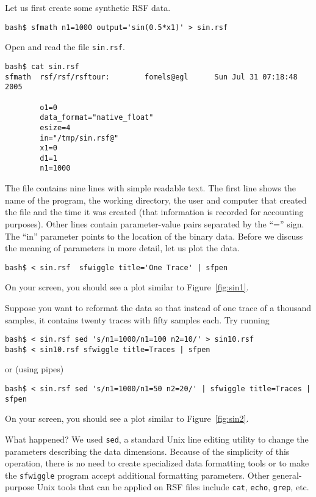 Let us first create some synthetic RSF data.
\begin{verbatim}
bash$ sfmath n1=1000 output='sin(0.5*x1)' > sin.rsf
\end{verbatim}

Open and read the file \texttt{sin.rsf}.
\begin{verbatim}
bash$ cat sin.rsf
sfmath  rsf/rsf/rsftour:        fomels@egl      Sun Jul 31 07:18:48 2005

        o1=0
        data_format="native_float"
        esize=4
        in="/tmp/sin.rsf@"
        x1=0
        d1=1
        n1=1000
\end{verbatim}
The file contains nine lines with simple readable text. The first line
shows the name of the program, the working directory, the user and
computer that created the file and the time it was created (that
information is recorded for accounting purposes). Other lines contain
parameter-value pairs separated by the ``='' sign. The ``in''
parameter points to the location of the binary data. Before we discuss
the meaning of parameters in more detail, let us plot the data.
\begin{verbatim}
bash$ < sin.rsf  sfwiggle title='One Trace' | sfpen
\end{verbatim}
On your screen, you should see a plot similar to Figure~\ref{fig:sin1}.

 
Suppose you want to reformat the data so that instead of one trace of a
thousand samples, it contains twenty traces with fifty samples each. Try
running
\begin{verbatim}
bash$ < sin.rsf sed 's/n1=1000/n1=100 n2=10/' > sin10.rsf 
bash$ < sin10.rsf sfwiggle title=Traces | sfpen
\end{verbatim}
or (using pipes)
\begin{verbatim}
bash$ < sin.rsf sed 's/n1=1000/n1=50 n2=20/' | sfwiggle title=Traces | sfpen
\end{verbatim}
On your screen, you should see a plot similar to Figure~\ref{fig:sin2}.


What happened? We used \texttt{sed}, a standard Unix line editing utility to
change the parameters describing the data dimensions. Because of the
simplicity of this operation, there is no need to create specialized data
formatting tools or to make the \texttt{sfwiggle} program accept additional
formatting parameters. Other general-purpose Unix tools that can be applied on
RSF files include \texttt{cat}, \texttt{echo}, \texttt{grep}, etc. 

